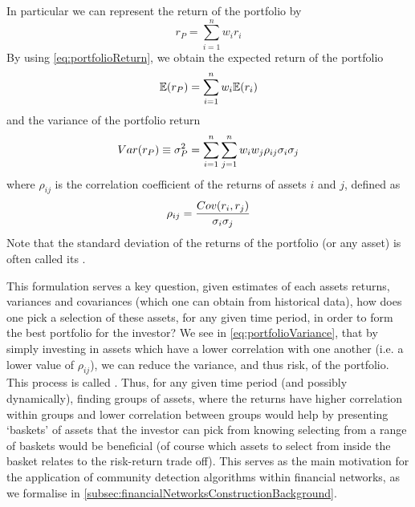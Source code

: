 In particular we can represent the return of the portfolio by
\begin{equation}
	\label{eq:portfolioReturn}
	r_{P} = \sum_{i=1}^{n} w_{i} r_{i}
\end{equation}
By using \cref{eq:portfolioReturn}, we obtain the expected return of the portfolio
\begin{equation}
	\label{eq:portfolioExpectedReturn}
	\mathbb{E}(r_{P}) = \sum_{i=1}^{n} w_{i} \mathbb{E}(r_{i})
\end{equation}
and the variance of the portfolio return
\begin{equation}
	\label{eq:portfolioVariance}
	Var(r_{P}) \equiv \sigma^{2}_{P}  = \sum_{i=1}^{n} \sum_{j=1}^{n} w_{i} w_{j} \rho_{ij} \sigma_{i} \sigma_{j}
\end{equation}
where $\rho_{ij}$ is the correlation coefficient of the returns of assets $i$ and $j$, defined as
\begin{equation}
	\label{eq:correlationCoefficient}
	\rho_{ij} = \frac{\covariance{r_{i},r_{j}}}{\sigma_{i} \sigma_{j}}
\end{equation}
Note that the standard deviation of the returns of the portfolio (or any asset) is often called its .

This formulation serves a key question, given estimates of each assets returns, variances and covariances (which one can obtain from historical data), how does one pick a selection of these assets, for any given time period, in order to form the best portfolio for the investor?
We see in \cref{eq:portfolioVariance}, that by simply investing in assets which have a lower correlation with one another (i.e. a lower value of $\rho_{ij}$), we can reduce the variance, and thus risk, of the portfolio. This process is called .
Thus, for any given time period (and possibly dynamically), finding groups of assets, where the returns have higher correlation within groups and lower correlation between groups would help by presenting `baskets' of assets that the investor can pick from knowing selecting from a range of baskets would be beneficial (of course which assets to select from inside the basket relates to the risk-return trade off).
This serves as the main motivation for the application of community detection algorithms within financial networks, as we formalise in \cref{subsec:financialNetworksConstructionBackground}.



